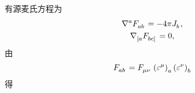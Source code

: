 \begin{xiti}
	\begin{jie}
		有源麦氏方程为
		\begin{gather}
			\tensor{\nabla}{^a} \tensor{F}{_a_b} = - 4 \pi \tensor{J}{_b},\label{eq-c8_Me1}\\
			\tensor{\nabla}{_{[a}} \tensor{F}{_{bc]}} = 0,\label{eq-c8_Me2}
		\end{gather}
		由
		\begin{equation*}
			\tensor{F}{_a_b} = \tensor{F}{_\mu_\nu} \tensor{\left( \varepsilon^\mu \right)}{_a} \tensor{\left( \varepsilon^\nu \right)}{_b}
		\end{equation*}
		得

\end{jie}
\end{xiti}
